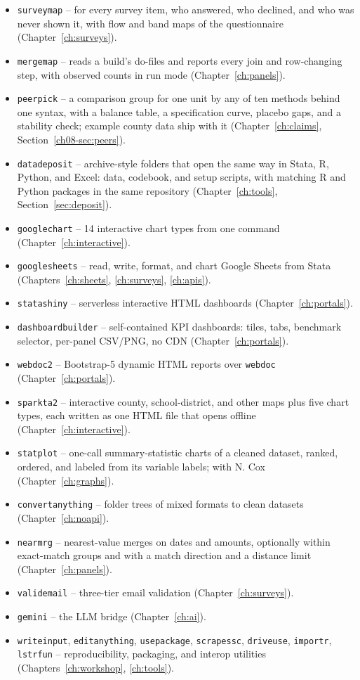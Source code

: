 \begin{itemize}
    \item \texttt{surveymap} -- for every survey item, who answered, who declined, and who was never shown it, with flow and band maps of the questionnaire (Chapter~\ref{ch:surveys}).
    \item \texttt{mergemap} -- reads a build's do-files and reports every join and row-changing step, with observed counts in run mode (Chapter~\ref{ch:panels}).
    \item \texttt{peerpick} -- a comparison group for one unit by any of ten methods behind one syntax, with a balance table, a specification curve, placebo gaps, and a stability check; example county data ship with it (Chapter~\ref{ch:claims}, Section~\ref{ch08-sec:peers}).
    \item \texttt{datadeposit} -- archive-style folders that open the same way in Stata, R, Python, and Excel: data, codebook, and setup scripts, with matching R and Python packages in the same repository (Chapter~\ref{ch:tools}, Section~\ref{sec:deposit}).
    \item \texttt{googlechart} -- 14 interactive chart types from one command (Chapter~\ref{ch:interactive}).
    \item \texttt{googlesheets} -- read, write, format, and chart Google Sheets from Stata (Chapters~\ref{ch:sheets}, \ref{ch:surveys}, \ref{ch:apis}).
    \item \texttt{statashiny} -- serverless interactive HTML dashboards (Chapter~\ref{ch:portals}).
    \item \texttt{dashboardbuilder} -- self-contained KPI dashboards: tiles, tabs, benchmark selector, per-panel CSV/PNG, no CDN (Chapter~\ref{ch:portals}).
    \item \texttt{webdoc2} -- Bootstrap-5 dynamic HTML reports over \texttt{webdoc} (Chapter~\ref{ch:portals}).
    \item \texttt{sparkta2} -- interactive county, school-district, and other maps plus five chart types, each written as one HTML file that opens offline (Chapter~\ref{ch:interactive}).
    \item \texttt{statplot} -- one-call summary-statistic charts of a cleaned dataset, ranked, ordered, and labeled from its variable labels; with N. Cox (Chapter~\ref{ch:graphs}).
    \item \texttt{convertanything} -- folder trees of mixed formats to clean datasets (Chapter~\ref{ch:noapi}).
    \item \texttt{nearmrg} -- nearest-value merges on dates and amounts, optionally within exact-match groups and with a match direction and a distance limit (Chapter~\ref{ch:panels}).
    \item \texttt{validemail} -- three-tier email validation (Chapter~\ref{ch:surveys}).
    \item \texttt{gemini} -- the LLM bridge (Chapter~\ref{ch:ai}).
    \item \texttt{writeinput}, \texttt{editanything}, \texttt{usepackage}, \texttt{scrapessc}, \texttt{driveuse}, \texttt{importr}, \texttt{lstrfun} -- reproducibility, packaging, and interop utilities (Chapters~\ref{ch:workshop}, \ref{ch:tools}).
\end{itemize}


